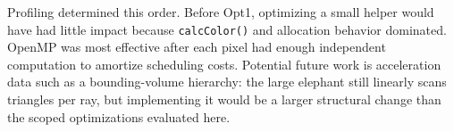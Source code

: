 \documentclass[sigplan,screen]{acmart}
\begin{document}
Profiling determined this order. Before Opt1, optimizing a small helper
would have had little impact because \texttt{calcColor()} and allocation
behavior dominated. OpenMP was most effective after each pixel had enough
independent computation to amortize scheduling costs. Potential future work
is acceleration data such as a bounding-volume hierarchy: the large elephant
still linearly scans triangles per ray, but implementing it would be a
larger structural change than the scoped optimizations evaluated here.
\end{document}
